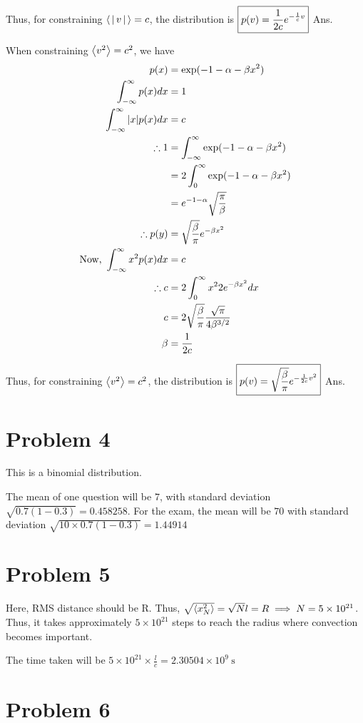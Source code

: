 \documentclass[12pt]{article}
\begin{document}
Thus, for constraining $\Braket{|v|} = c$, the distribution is $\boxed{p(v) = \frac1{2c} e^{-\frac{1} {c}v}}\hfill$ Ans.

When constraining $\Braket{v^2} = c^2$, we have 
\begin{align*}
p(x) &= \exp(-1-\alpha - \beta x^2)\\
\int_{-\infty}^\infty p(x) dx &= 1\\
\int_{-\infty}^\infty |x| p(x) dx &= c\\
\therefore 1 &= \int_{-\infty}^\infty \exp(-1-\alpha - \beta x^2) \\
 &= 2\int_0^\infty \exp(-1-\alpha - \beta x^2)\\
 &= e^{-1-\alpha}\sqrt{\frac{\pi}{\beta}}\\
 \therefore p(y) &= \sqrt{\frac{\beta}{\pi}} e^{-\beta x^2}\\
 \text {Now, } \int_{-\infty}^\infty x^2 p(x) dx &= c\\
 \therefore c &= 2\int_0^\infty x^2 2 e^{-\beta x^2}dx \\
 c &=  2 \sqrt{\frac{\beta}{\pi}}\frac{\sqrt{\pi}}{4 \beta^{3/2}}\\
 \beta &=\frac{1}{2 c}
 \end{align*}
 
 Thus, for constraining $\Braket{v^2} = c^2$, the distribution is $\boxed{p(v) = \sqrt{\frac{\beta}{\pi}} e^{-\frac{1} {2c}v^2}}\hfill$ Ans.
\section*{Problem 4}
This is a binomial distribution.

The mean of one question will be $7$, with standard deviation $\sqrt{0.7(1-0.3)} = 0.458258$. For the exam, the mean will be $70$ with standard deviation $\sqrt{10\times 0.7(1-0.3)} = 1.44914$

\section*{Problem 5}

Here, RMS distance should be R. Thus, $\sqrt{\Braket{x_N^2}} = \sqrt{N}l = R \implies N = 5\times 10^{21}$. Thus, it takes approximately $\boxed{5\times 10^{21}}$ steps to reach the radius where convection becomes important.

The time taken will be $5\times 10^{21}\times \frac{l}{c} = \boxed{2.30504\times 10^9 ~\mathrm s}$

\section*{Problem 6}
\end{document}
